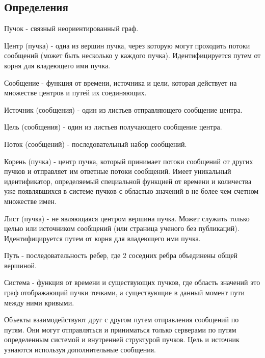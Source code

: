 \hypertarget{ux43eux43fux440ux435ux434ux435ux43bux435ux43dux438ux44f}{%
\subsection{Определения}\label{ux43eux43fux440ux435ux434ux435ux43bux435ux43dux438ux44f}}

Пучок - связный неориентированный граф.

Центр (пучка) - одна из вершин пучка, через которую могут проходить
потоки сообщений (может быть несколько у каждого пучка).
Идентифицируется путем от корня для владеющего ими пучка.

Сообщение - функция от времени, источника и цели, которая действует на
множестве центров и путей их соединяющих.

Источник (сообщения) - один из листьев отправляющего сообщение центра.

Цель (сообщения) - один из листьев получающего сообщение центра.

Поток (сообщений) - последовательный набор сообщений.

Корень (пучка) - центр пучка, который принимает потоки сообщений от
других пучков и отправляет им ответные потоки сообщений. Имеет
уникальный идентификатор, определяемый специальной функцией от времени и
количества уже появлявшихся в системе пучков с областью значений в не
более чем счетном множестве имен.

Лист (пучка) - не являющаяся центром вершина пучка. Может служить только
целью или источником сообщений (или страница ученого без публикаций).
Идентифицируется путем от корня для владеющего ими пучка.

Путь - последовательность ребер, где 2 соседних ребра объединены общей
вершиной.

Система - функция от времени и существующих пучков, где область значений
это граф отображающий пучки точками, а существующие в данный момент пути
между ними кривыми.

Объекты взаимодействуют друг с другом путем отправления сообщений по
путям. Они могут отправляться и приниматься только серверами по путям
определенным системой и внутренней структурой пучков. Цель и источник
узнаются используя дополнительные сообщения.

